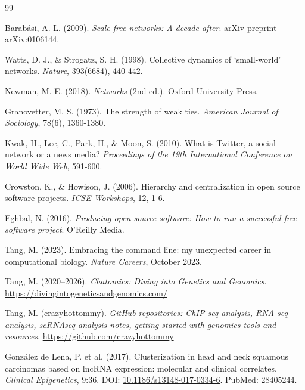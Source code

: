 \documentclass[11pt]{article}
\begin{document}
\newpage
\begin{thebibliography}{99}

Barab\'{a}si, A. L. (2009). \textit{Scale-free networks: A decade after}. arXiv preprint arXiv:0106144.

Watts, D. J., \& Strogatz, S. H. (1998). Collective dynamics of `small-world' networks. \textit{Nature}, 393(6684), 440-442.

Newman, M. E. (2018). \textit{Networks} (2nd ed.). Oxford University Press.

Granovetter, M. S. (1973). The strength of weak ties. \textit{American Journal of Sociology}, 78(6), 1360-1380.

Kwak, H., Lee, C., Park, H., \& Moon, S. (2010). What is Twitter, a social network or a news media? \textit{Proceedings of the 19th International Conference on World Wide Web}, 591-600.

Crowston, K., \& Howison, J. (2006). Hierarchy and centralization in open source software projects. \textit{ICSE Workshops}, 12, 1-6.

Eghbal, N. (2016). \textit{Producing open source software: How to run a successful free software project}. O'Reilly Media.

Tang, M. (2023). Embracing the command line: my unexpected career in computational biology. \textit{Nature Careers}, October 2023.

Tang, M. (2020--2026). \textit{Chatomics: Diving into Genetics and Genomics}. \url{https://divingintogeneticsandgenomics.com/}

Tang, M. (crazyhottommy). \textit{GitHub repositories: ChIP-seq-analysis, RNA-seq-analysis, scRNAseq-analysis-notes, getting-started-with-genomics-tools-and-resources}. \url{https://github.com/crazyhottommy}

Gonz\'{a}lez de Lena, P. et al. (2017). Clusterization in head and neck squamous carcinomas based on lncRNA expression: molecular and clinical correlates. \textit{Clinical Epigenetics}, 9:36. DOI: \href{https://doi.org/10.1186/s13148-017-0334-6}{10.1186/s13148-017-0334-6}. PubMed: 28405244.

\end{thebibliography}

\end{document}
